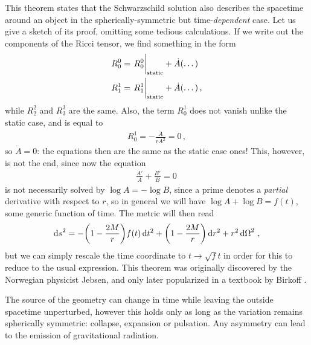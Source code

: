 \documentclass[main.tex]{subfiles}
\begin{document}
This theorem states that the Schwarzschild solution also describes the spacetime around an object in the spherically-symmetric but time-\emph{dependent} case. Let us give a sketch of its proof, omitting some tedious calculations. 
If we write out the components of the Ricci tensor, we find something in the form 
%
\begin{align}
R^{0}_{0} &= \eval{R^{0}_{0}}_{\text{static}} + \dot{A} \qty(\dots)\\
R^{1}_{1} &= \eval{R^{1}_{1}}_{\text{static}} + \dot{A} \qty(\dots)
\,,
\end{align}
%
while \(R^{2}_{2}\) and \(R^{3}_{3}\) are the same. Also, the term \(R^{1}_{0}\) does not vanish unlike the static case, and is equal to 
%
\begin{align}
R^{1}_{0} = - \frac{\dot{A}}{r A^2} = 0
\,,
\end{align}
%
so \(\dot{A} = 0\): the equations then are the same as the static case ones!
This, however, is not the end, since now the equation 
%
\begin{align}
\frac{A'}{A} + \frac{B'}{B} = 0
\,
\end{align}
%
is not necessarily solved by \(\log A = - \log B\), since a prime denotes a \emph{partial} derivative with respect to \(r\), so in general we will have \(\log A + \log B = f(t)\), some generic function of time. 
The metric will then read 
%
\begin{align}
\dd{s}^2 = - \qty(1 - \frac{2M}{r}) f(t)\dd{t^2} + \qty(1 - \frac{2M}{r}) \dd{r^2} + r^2 \dd{\Omega}^2
\,,
\end{align}
%
but we can simply rescale the time coordinate to \(t \to \sqrt{f} t\) in order for this to reduce to the usual expression.
This theorem was originally discovered by the Norwegian physicist Jebsen, and only later popularized in a textbook by Birkoff \cite{johansenDiscoveryBirkhoffTheorem2005}. 

The source of the geometry can change in time while leaving the outside spacetime unperturbed, however this holds only as long as the variation remains spherically symmetric: collapse, expansion or pulsation. 
Any asymmetry can lead to the emission of gravitational radiation.  
\end{document}
